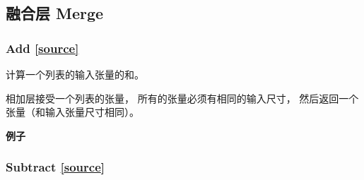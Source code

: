 
\subsection{融合层 Merge}
\subsubsection{Add {\href{https://github.com/keras-team/keras/blob/master/keras/layers/merge.py\#L193}{{[}source{]}}}}

\begin{Shaded}
\begin{Highlighting}[]
\end{Highlighting}
\end{Shaded}

计算一个列表的输入张量的和。

相加层接受一个列表的张量， 所有的张量必须有相同的输入尺寸，
然后返回一个张量（和输入张量尺寸相同）。

\textbf{例子}

\begin{Shaded}
\begin{Highlighting}[]
 

\OperatorTok{=} \OperatorTok{=}\NormalTok{(}\NormalTok{,))}
\OperatorTok{=} \OperatorTok{=}
\OperatorTok{=} \OperatorTok{=}\NormalTok{(}\NormalTok{,))}
\OperatorTok{=} \OperatorTok{=}
\OperatorTok{=} 

\OperatorTok{=} 
\OperatorTok{=} \OperatorTok{=}\OperatorTok{=}
\end{Highlighting}
\end{Shaded}




\subsubsection{Subtract {\href{https://github.com/keras-team/keras/blob/master/keras/layers/merge.py\#L223}{{[}source{]}}}}

